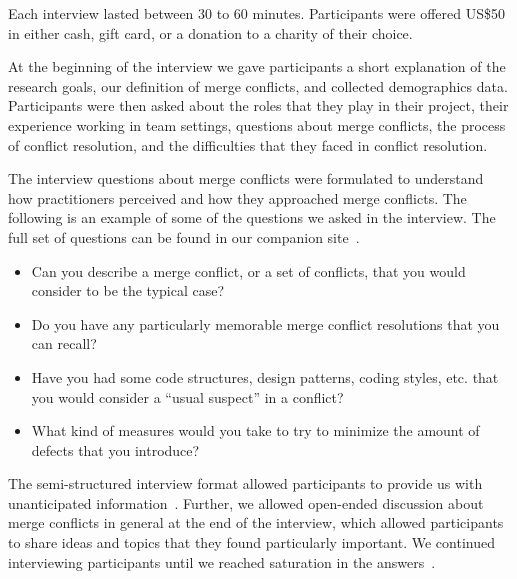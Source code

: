 
Each interview lasted between 30 to 60 minutes. Participants were offered US\$50 in either cash, gift card, or a donation to a charity of their choice.

At the beginning of the interview we gave participants a short explanation of the research goals, our definition of merge conflicts, and collected demographics data. 
Participants were then asked about the roles that they play in their project, their experience working in team settings,  questions about merge conflicts, the process of conflict resolution, and the difficulties that they faced in conflict resolution.

The interview questions about merge conflicts were formulated to understand how practitioners perceived and how they approached merge conflicts.
The following is an example of some of the questions we asked in the interview. The full set of questions can be found in our companion site~\cite{companion_site}.
\begin{itemize}
	\item Can you describe a merge conflict, or a set of conflicts, that you would consider to be the typical case?
	\item Do you have any particularly memorable merge conflict resolutions that you can recall?
	\item Have you had some code structures, design patterns, coding styles, etc. that you would consider a ``usual suspect'' in a conflict?
	\item What kind of measures would you take to try to minimize the amount of defects that you introduce?
\end{itemize}


The semi-structured interview format allowed participants to provide us with unanticipated information~\cite{seaman2008qualitative}. Further, we allowed open-ended discussion about merge conflicts in general at the end of the interview, which allowed participants to share ideas and topics that they found particularly important. We continued interviewing participants until we reached saturation in the answers~\cite{fusch2015we}.

